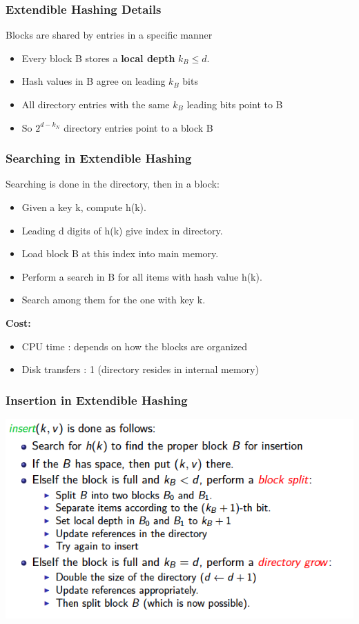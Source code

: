 \documentclass{article}
\begin{document}
\subsubsection*{Extendible Hashing Details}
Blocks are shared by entries in a specific manner 
\begin{itemize}
\item Every block B stores a \textbf{local depth} \(k_B \leq d\).
\item Hash values in B agree on leading \(k_B\) bits
\item All directory entries with the same \(k_B\) leading bits point to B
\item So \(2^{d-k_N}\) directory entries point to a block B 
\end{itemize}

\subsubsection*{Searching in Extendible Hashing}
Searching is done in the directory, then in a block:
\begin{itemize}
\item Given a key k, compute h(k).
\item Leading d digits of h(k) give index in directory.
\item Load block B at this index into main memory.
\item Perform a search in B for all items with hash value h(k).
\item Search among them for the one with key k.
\end{itemize}
\textbf{Cost:}
\begin{itemize}
\item CPU  time : depends on how the blocks are organized
\item Disk transfers : 1 (directory resides in internal memory)
\end{itemize}

\subsubsection*{Insertion in Extendible Hashing}
\begin{center}
\includegraphics[scale=0.7]{5}
\end{center}
\end{document}
